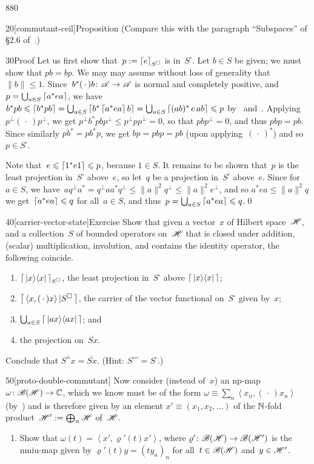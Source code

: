 \begin{parsec}{880}
\begin{point}{20}[commutant-ceil]{Proposition}
(Compare this with the paragraph ``Subspaces'' of \S2.6 of~\cite{kr}.)
\begin{point}{30}{Proof}%
Let us first show that~$p:= \left\lceil e\right\rceil_{S^\square}$
is in~$S^\square$.
Let $b\in S$ be given;
we must show that $pb=bp$.
We may may assume without loss of generality that~$\|b\|\leq 1$.
Since~$b^*(\,\cdot\,)b\colon \mathscr{A}\to\mathscr{A}$
is normal and completely positive,
and $p=\bigcup_{a\in S} \left\lceil a^*ea\right\rceil$,
we have $b^*pb\leqslant \left\lceil b^*pb\right\rceil = 
\bigcup_{a\in S} \left\lceil b^* \left\lceil a^* e a\right\rceil b \right\rceil
= \bigcup_{a\in S} \left\lceil(ab)^* \,e\, ab\right\rceil \leqslant p$
by~ and~.
Applying $p^\perp(\,\cdot\,)p^\perp$,
we get $p^\perp b^*pb p^\perp 
\leq p^\perp p p^\perp = 0$,
so that $pbp^\perp=0$,
and thus $pbp=pb$.
Since similarly $pb^* =pb^*p$,
we get  $bp=pbp=pb$
(upon applying~$(\,\cdot\,)^*$) and so~$p\in S^\square$.

Note that~$e\leqslant \left\lceil1^* e 1\right\rceil\leqslant p$, because $1\in S$.
It remains to be shown that~$p$ is the least projection in~$S^\square$
above~$e$, so let~$q$ be a projection in~$S^\square$ above~$e$.
Since for~$a\in S$,
we have~$aq^\perp a^*=  q^\perp aa^* q^\perp 
\leq \|a\|^2q^\perp \leq \|a\|^2e^\perp$,
and so $a^*ea\leq \|a\|^2q$ 
we get~$\left\lceil a^*ea\right\rceil\leqslant q$
for all~$a\in S$,
and thus~$p=\bigcup_{a\in S}\left\lceil a^*ea\right\rceil \leqslant q$.\qed
\end{point}
\end{point}

\begin{point}{40}[carrier-vector-state]{Exercise}%
Show that given a vector~$x$ of Hilbert space~$\mathscr{H}$,
and a collection~$S$ of bounded operators on~$\mathscr{H}$
that is closed under addition, (scalar) multiplication,
involution, and contains the identity operator,
the following coincide.
\begin{enumerate}
\item
$\left\lceil\,\left|x\right>\!\left<x\right|\,\right\rceil_{S^\square}$,
the least projection in~$S^\square$
above $\left\lceil\,\left|x\right>\!\left<x\right|\,\right\rceil$;
\item
$\left\lceil\,\left<x,(\,\cdot\,)x\right>|S^\square\,\right\rceil$,
the carrier of the vector functional on~$S^\square$
given by~$x$;
\item
$\bigcup_{a\in S} \left\lceil\,\left|ax\right>\!\left<ax\right|\,\right\rceil$; and 
\item
the projection on~$\overline{S x}$.
\end{enumerate}
Conclude that $\overline{S^{\square\square}x}
=\overline{S x}$.
(Hint: $S^{\square\square\square}=S^\square$.)
\begin{point}{50}[proto-double-commutant]%
Now consider
(instead of~$x$)
an np-map $\omega\colon \mathscr{B}(\mathscr{H})\to \mathbb{C}$,
which we know must be of the form
$\omega\equiv \sum_n \left<x_n,(\,\cdot\,)x_n\right>$
(by~)
and is therefore given by 
an element $x'\equiv (x_1,x_2,\dotsc)$ of the $\mathbb{N}$-fold
product~$\mathscr{H}':=\bigoplus_n\mathscr{H}$ of~$\mathscr{H}$.
\begin{enumerate}
\item
Show that  $\omega(t)=\left<x',\varrho'(t)x'\right>$,
where $\varrho'\colon \mathscr{B}(\mathscr{H})\to\mathscr{B}(\mathscr{H}')$
is the nmiu-map given by 
$\varrho'(t)y=(ty_n)_n$
for all~$t\in\mathscr{B}(\mathscr{H})$ and~$y\in\mathscr{H}'$.


\end{enumerate}
\end{point}
\end{point}
\end{parsec}
